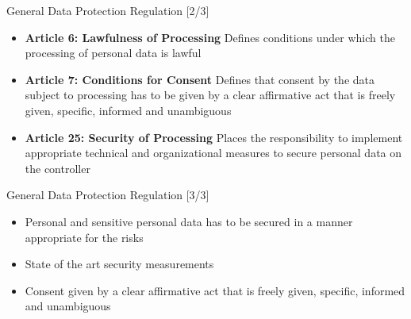 \documentclass[xcolor=table]{beamer}
\begin{document}
\begin{frame}{General Data Protection Regulation [2/3]}
\begin{itemize}[label={}]
    \item{\textbf{Article 6: Lawfulness of Processing}}  Defines conditions under which the processing of personal data is lawful \cite{GDPR6}
    \item{\textbf{Article 7: Conditions for Consent}}  Defines that consent by the data subject to processing has to be given by a clear affirmative act that is freely given, specific, informed and unambiguous \cite{GDPR7}
    \item{\textbf{Article 25: Security of Processing}}  Places the responsibility to implement appropriate technical and organizational measures to secure personal data on the controller \cite{GDPR25}
\end{itemize}
\end{frame}

\begin{frame}{General Data Protection Regulation [3/3]}
\begin{itemize}
    \item Personal and sensitive personal data has to be secured in a manner appropriate for the risks
    \item State of the art security measurements
    \item Consent given by a clear affirmative act that is freely given, specific, informed and unambiguous
\end{itemize}
\end{frame}

\end{document}
